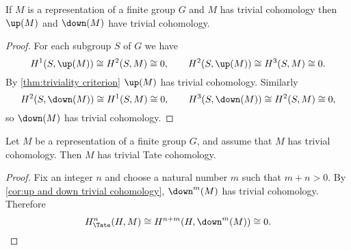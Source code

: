 \begin{corollary}	\label{cor:up and down trivial cohomology}
	\leanok
	If $M$ is a representation of a finite group $G$ and $M$ has trivial cohomology
	then $\up(M)$ and $\down(M)$ have trivial cohomology.
\end{corollary}

\begin{proof}
	For each subgroup $S$ of $G$ we have
	\[
		H^1(S,\up(M)) \cong H^2(S,M) \cong 0,
		\qquad
		H^2(S,\up(M)) \cong H^3(S,M) \cong 0.
	\]
	By \ref{thm:triviality criterion} $\up(M)$ has trivial cohomology.
	Similarly
	\[
		H^2(S,\down(M)) \cong H^1(S,M) \cong 0,
		\qquad
		H^3(S,\down(M)) \cong H^2(S,M) \cong 0,
	\]
	so $\down(M)$ has trivial cohomology.
\end{proof}

\begin{theorem} \label{thm:trivial cohomology implies trivial Tate}
	Let $M$ be a representation of a finite group $G$, and assume that $M$ has trivial cohomology.
	Then $M$ has trivial Tate cohomology.
\end{theorem}

\begin{proof}
	Fix an integer $n$ and choose a natural number $m$ such that $m + n > 0$.
	By \ref{cor:up and down trivial cohomology}, $\down^m(M)$ has trivial cohomology.
	Therefore
	\[
		H^n_{\Tate}(H,M) \cong H^{n+m}(H, \down^m(M)) \cong 0.
	\]
\end{proof}





